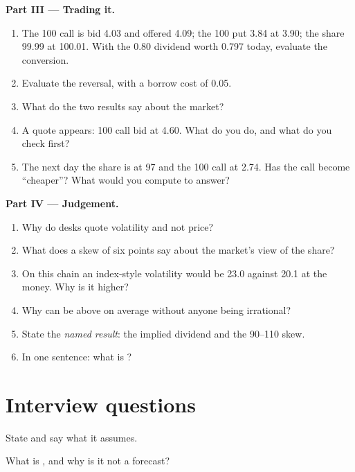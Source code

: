 \begin{problem}
\medskip\noindent\textbf{Part III --- Trading it.}
\begin{enumerate}[resume]
\item The 100 call is bid 4.03 and offered 4.09; the 100 put 3.84 at 3.90; the
share 99.99 at 100.01. With the 0.80 dividend worth 0.797 today, evaluate the
conversion.
\item Evaluate the reversal, with a borrow cost of 0.05.
\item What do the two results say about the market?
\item A quote appears: 100 call bid at 4.60. What do you do, and what do you
check first?
\item The next day the share is at 97 and the 100 call at 2.74. Has the call
become ``cheaper''? What would you compute to answer?
\end{enumerate}

\medskip\noindent\textbf{Part IV --- Judgement.}
\begin{enumerate}[resume]
\item Why do desks quote volatility and not price?
\item What does a skew of six points say about the market's view of the
share?
\item On this chain an index-style volatility would be 23.0 against 20.1 at
the money. Why is it higher?
\item Why can  be above  on average
without anyone being irrational?
\item State the \emph{named result}: the implied dividend and the 90--110
skew.
\item In one sentence: what is ?
\end{enumerate}
\end{problem}

\section{Interview questions}

\begin{interviewq}\label{iq:m1:volatility-first-contact:1}
State  and say what it assumes.
\end{interviewq}

\begin{interviewq}\label{iq:m1:volatility-first-contact:2}
What is , and why is it not a forecast?
\end{interviewq}

